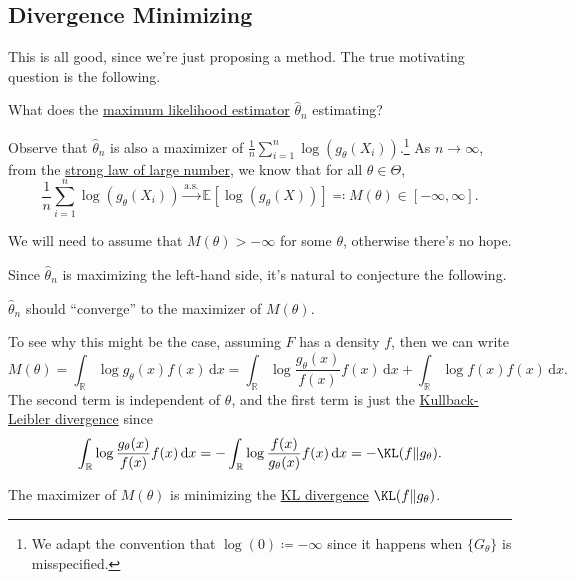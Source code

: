 \subsection{Divergence Minimizing}
This is all good, since we're just proposing a method. The true motivating question is the following.

\begin{problem*}
	What does the \hyperref[def:MLE]{maximum likelihood estimator} \(\hat{\theta} _n\) estimating?
\end{problem*}

Observe that \(\hat{\theta} _n\) is also a maximizer of \(\frac{1}{n} \sum_{i=1}^{n} \log (g_\theta (X_i))\).\footnote{We adapt the convention that \(\log (0) \coloneqq -\infty \) since it happens when \(\{ G_\theta  \} \) is misspecified.} As \(n\to \infty \), from the \hyperref[thm:SLLN]{strong law of large number}, we know that for all \(\theta \in \Theta \),
\[
	\frac{1}{n} \sum_{i=1}^{n} \log (g_\theta (X_i))
	\overset{\text{a.s.} }{\to} \mathbb{E}_{}[\log (g_\theta (X))]
	\eqqcolon M(\theta ) \in [-\infty , \infty ].
\]

\begin{note}
	We will need to assume that \(M(\theta ) > -\infty \) for some \(\theta \), otherwise there's no hope.
\end{note}

Since \(\hat{\theta} _n\) is maximizing the left-hand side, it's natural to conjecture the following.

\begin{conjecture}\label{conj:MLE-consistency}
	\(\hat{\theta} _n\) should ``converge'' to the maximizer of \(M(\theta )\).
\end{conjecture}

To see why this might be the case, assuming \(F\) has a density \(f\), then we can write
\[
	M(\theta )
	= \int_{\mathbb{R} } \log g_\theta (x) f(x) \,\mathrm{d} x
	= \int_{\mathbb{R} } \log \frac{g_\theta (x)}{f(x)} f(x) \,\mathrm{d} x + \int_{\mathbb{R} } \log f(x) f(x) \,\mathrm{d} x .
\]
The second term is independent of \(\theta \), and the first term is just the \href{https://en.wikipedia.org/wiki/Kullback%E2%80%93Leibler_divergence}{Kullback-Leibler divergence} since
\[
	\int_{\mathbb{R} } \log \frac{g_\theta (x)}{f(x)} f(x) \,\mathrm{d} x
	= - \int_{\mathbb{R} } \log \frac{f(x)}{g_\theta (x)} f(x) \,\mathrm{d} x
	= - \KL(f \Vert g_\theta ) .
\]

\begin{remark}
	The maximizer of \(M(\theta )\) is minimizing the \href{https://en.wikipedia.org/wiki/Kullback%E2%80%93Leibler_divergence}{KL divergence} \(\KL(f \Vert g_\theta ) \).
\end{remark}

